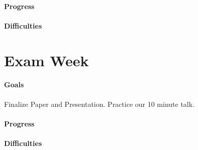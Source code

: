 \documentclass[11pt]{article}
\begin{document}
\paragraph{Progress}
\paragraph{Difficulties}


\section{Exam Week} 

\paragraph{Goals} Finalize Paper and Presentation.  Practice our 10 minute talk.
\paragraph{Progress}
\paragraph{Difficulties}
\end{document}
